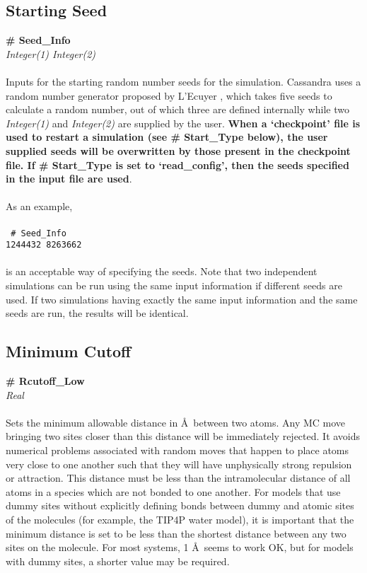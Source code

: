 %
%
\subsection{Starting Seed}\label{sec:Seed_Info}
{\bf \# Seed\_Info} \\ 
{\it Integer(1) Integer(2)} \\ \\
%
Inputs for the starting random number seeds for the simulation. 
Cassandra uses a random  number generator proposed by L'Ecuyer \cite{random_gen:1999}, 
which takes five seeds to calculate a random number, 
out of which three are defined internally while two {\it Integer(1)} and 
{\it Integer(2)} are supplied by the user. 
{\bf When a `checkpoint' file is used to restart a
simulation (see \# Start\_Type below), the user supplied seeds will be
overwritten by those present in the checkpoint file. 
If \# Start\_Type is set to `read\_config', 
then the seeds specified in the input file are used}.  \\ \\
As an example, \\ \\ 
\texttt{
\# Seed\_Info \\
1244432 8263662
} \\ \\
is an acceptable way of specifying the seeds. 
Note that two independent simulations can be run using the same input 
information if different seeds are used. 
If two simulations having exactly the same input
information and the same seeds are run, the results will be identical. 
%
%
%
\subsection{Minimum Cutoff}\label{sec:Rcutoff_Low}
{\bf \# Rcutoff\_Low} \\
{\it Real} \\ \\
%
Sets the minimum allowable distance in \AA\ between two atoms. 
Any MC move bringing two sites closer than this distance will be immediately rejected. 
It avoids numerical 
problems associated with random moves that happen to place atoms very
close to one another such that they will have unphysically strong repulsion or
attraction. This distance must be less than the intramolecular
distance of all atoms in a species which are not bonded to one
another. For models that use dummy sites without explicitly defining
bonds between dummy and atomic sites of the molecules (for example,
the TIP4P water model), it is important that the minimum distance is set to be less
than the shortest distance between any two sites on the molecule. For
most systems, 1 \AA\ seems to work OK, but for models with dummy
sites, a shorter value may be required. 
%
%
